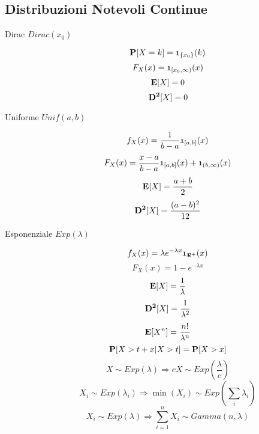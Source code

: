 \subsection{Distribuzioni Notevoli Continue}
\begin{description}
	
	\item[Dirac $Dirac(x_{0})$]
		\begin{equation}
		\mathbf{P}[X=k] = \mathfrak{1}_{\{x_{0}\}}(k)
		\end{equation}
		\begin{equation}
		F_{X}(x)=\mathfrak{1}_{[x_{0},\infty)}(x)
		\end{equation}
		\begin{equation}
		\mathbf{E}[X]=0
		\end{equation}
		\begin{equation}
		\mathbf{D^{2}}[X]=0
		\end{equation}
	
	\item[Uniforme $Unif(a,b)$]
		\begin{equation}
		f_{X}(x)=\frac{1}{b-a}\mathfrak{1}_{[a,b]}(x)
		\end{equation}
		\begin{equation}
		F_{X}(x)=\frac{x-a}{b-a}\mathfrak{1}_{[a,b]}(x)+\mathfrak{1}_{(b,\infty)}(x)
		\end{equation}
		\begin{equation}
		\mathbf{E}[X]=\frac{a+b}{2}
		\end{equation}
		\begin{equation}
		\mathbf{D^{2}}[X]=\frac{(a-b)^{2}}{12}
		\end{equation}
		
	\item[Esponenziale $Exp(\lambda)$]
		\begin{equation}
		f_{X}(x)=\lambda e^{-\lambda x} \mathfrak{1}_{\Re^{+}}(x)
		\end{equation}
		\begin{equation}
		F_{X}(x)=1-e^{-\lambda x}
		\end{equation}
		\begin{equation}
		\mathbf{E}[X]=\frac{1}{\lambda}
		\end{equation}
		\begin{equation}
		\mathbf{D^{2}}[X]=\frac{1}{\lambda^{2}}
		\end{equation}
		\begin{equation}
		\mathbf{E}[X^{n}]=\frac{n!}{\lambda^{n}}
		\end{equation}
		\begin{equation}
		\mathbf{P}[X>t+x|X>t]=\mathbf{P}[X>x]
		\end{equation}
		\begin{equation}
		X\sim Exp(\lambda)\Rightarrow cX\sim Exp(\frac{\lambda}{c})
		\end{equation}
		\begin{equation}
		X_{i}\sim Exp(\lambda_{i})\Rightarrow \min(X_{i})\sim Exp(\sum_{i}\lambda_{i})
		\end{equation}
		\begin{equation}
		X_{i}\sim Exp(\lambda)\Rightarrow \sum_{i=1}^{n}X_{i}\sim Gamma(n,\lambda)
		\end{equation}		


\end{description}
